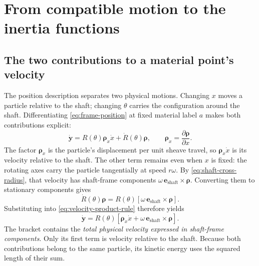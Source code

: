 \documentclass[11pt,letterpaper]{article}
\numberwithin{equation}{section}
\newcommand{\e}{\bm e_{\mathrm{shaft}}}
\newcommand{\rhoo}{\bm\rho}
\begin{document}
\section{From compatible motion to the inertia functions}
\label{sec:maps}

\subsection{The two contributions to a material point's velocity}
\label{sec:velocity}

The position description separates two physical motions. Changing $x$ moves a particle relative to the shaft; changing $\theta$ carries the configuration around the shaft. Differentiating \cref{eq:frame-position} at fixed material label $a$ makes both contributions explicit:
\begin{equation}
  \dot{\bm y}
    =R(\theta)\rhoo_x\dot x+\dot R(\theta)\rhoo,
  \qquad \rhoo_x=\frac{\partial\rhoo}{\partial x}.
  \label{eq:velocity-product-rule}
\end{equation}
The factor $\rhoo_x$ is the particle's displacement per unit sheave travel, so $\rhoo_x\dot x$ is its velocity relative to the shaft. The other term remains even when $x$ is fixed: the rotating axes carry the particle tangentially at speed $r\omega$. By \cref{eq:shaft-cross-radius}, that velocity has shaft-frame components $\omega\,\e\times\rhoo$. Converting them to stationary components gives
\begin{equation}
  \dot R(\theta)\rhoo
      =R(\theta)\left[\omega\,\e\times\rhoo\right].
  \label{eq:rotation-velocity}
\end{equation}
Substituting into \cref{eq:velocity-product-rule} therefore yields
\begin{equation}
  \dot{\bm y}
    =R(\theta)\left[\rhoo_x\dot x+\omega\,\e\times\rhoo\right].
  \label{eq:material-velocity}
\end{equation}
The bracket contains the \emph{total physical velocity expressed in shaft-frame components}. Only its first term is velocity relative to the shaft. Because both contributions belong to the same particle, its kinetic energy uses the squared length of their sum.
\end{document}
